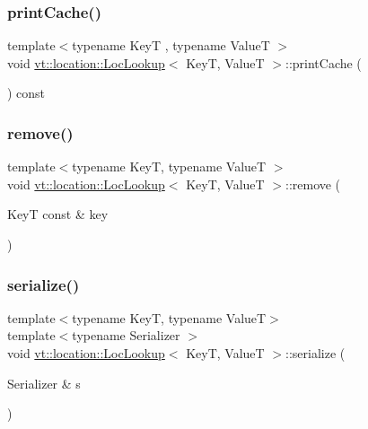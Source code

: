 \subsubsection{\texorpdfstring{print\+Cache()}{printCache()}}
{\footnotesize\ttfamily template$<$typename KeyT , typename ValueT $>$ \\
void \hyperlink{structvt_1_1location_1_1_loc_lookup}{vt\+::location\+::\+Loc\+Lookup}$<$ KeyT, ValueT $>$\+::print\+Cache (\begin{DoxyParamCaption}{ }\end{DoxyParamCaption}) const}

\mbox{\label{structvt_1_1location_1_1_loc_lookup_a6c82de648f51e3242bd7430d185041fe}} 
\subsubsection{\texorpdfstring{remove()}{remove()}}
{\footnotesize\ttfamily template$<$typename KeyT, typename ValueT $>$ \\
void \hyperlink{structvt_1_1location_1_1_loc_lookup}{vt\+::location\+::\+Loc\+Lookup}$<$ KeyT, ValueT $>$\+::remove (\begin{DoxyParamCaption}\item[{KeyT const \&}]{key }\end{DoxyParamCaption})}

\mbox{\label{structvt_1_1location_1_1_loc_lookup_ae9630052fad15f278030f1dbf8e2a545}} 
\subsubsection{\texorpdfstring{serialize()}{serialize()}}
{\footnotesize\ttfamily template$<$typename KeyT, typename ValueT$>$ \\
template$<$typename Serializer $>$ \\
void \hyperlink{structvt_1_1location_1_1_loc_lookup}{vt\+::location\+::\+Loc\+Lookup}$<$ KeyT, ValueT $>$\+::serialize (\begin{DoxyParamCaption}\item[{Serializer \&}]{s }\end{DoxyParamCaption})\hspace{0.3cm}{\ttfamily [inline]}}

